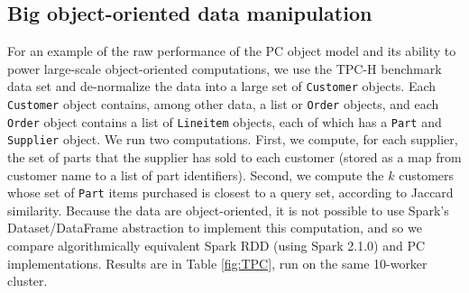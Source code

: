 \subsection{Big object-oriented data manipulation}
For an example of the raw performance of the PC object model and its ability to power large-scale 
object-oriented computations, we use the TPC-H benchmark data set \cite{council2008tpc}
and de-normalize
the data into a large set of \texttt{Customer} objects. Each
\texttt{Customer} object contains, among
other data, a list
or \texttt{Order} objects, and each \texttt{Order} object contains a list of \texttt{Lineitem} objects,
each of which has a \texttt{Part} and \texttt{Supplier} object.  
We run two computations. First, we compute, for each supplier,
the set of parts that the supplier has sold to each customer (stored
as a map from customer name to a list of part identifiers).
Second, we compute the $k$ customers whose set of \texttt{Part} items purchased is closest to
a query set, according to Jaccard similarity.
Because the data are object-oriented, it
is not possible to use Spark's Dataset/DataFrame abstraction to implement this computation, and so
we compare algorithmically equivalent Spark RDD (using Spark 2.1.0) and PC implementations.
Results are in Table \ref{fig:TPC}, run on the same 10-worker cluster.  

